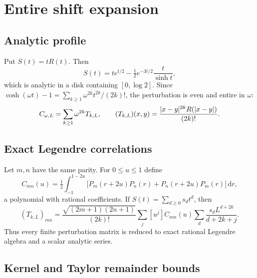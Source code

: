 \documentclass[11pt,a4paper]{article}
\newcommand{\dd}{\,\mathrm d}
\DeclarePairedDelimiter{\abs}{\lvert}{\rvert}
\theoremstyle{plain}
\theoremstyle{definition}
\numberwithin{equation}{section}
\begin{document}
\section{Entire shift expansion}

\subsection{Analytic profile}

Put $S(t)=tR(t)$. Then
\begin{equation}
S(t)=te^{t/2}-\tfrac12e^{-3t/2}\frac{t}{\sinh t},
\end{equation}
which is analytic in a disk containing $[0,\log2]$. Since
$\cosh(\omega t)-1=\sum_{k\ge1}\omega^{2k}t^{2k}/(2k)!$, the perturbation is
even and entire in $\omega$:
\begin{equation}
C_{\omega,L}=\sum_{k\ge1}\omega^{2k}T_{k,L},
\qquad
(T_{k,L})(x,y)=\frac{\abs{x-y}^{2k}R(\abs{x-y})}{(2k)!}.
\end{equation}

\subsection{Exact Legendre correlations}

Let $m,n$ have the same parity. For $0\le u\le1$ define
\begin{equation}
C_{mn}(u)=\tfrac12\int_{-1}^{1-2u}\bigl[P_m(r+2u)P_n(r)+P_n(r+2u)P_m(r)\bigr]\dd r ,
\end{equation}
a polynomial with rational coefficients. If $S(t)=\sum_{d\ge0}s_dt^d$, then
\begin{equation}\label{eq:Tk-entries}
(T_{k,L})_{mn}=\frac{\sqrt{(2m+1)(2n+1)}}{(2k)!}
\sum_j[u^j]C_{mn}(u)\sum_d\frac{s_dL^{d+2k}}{d+2k+j} .
\end{equation}
Thus every finite perturbation matrix is reduced to exact rational Legendre
algebra and a scalar analytic series.

\subsection{Kernel and Taylor remainder bounds}\label{sec:kernel-bound}
\end{document}
